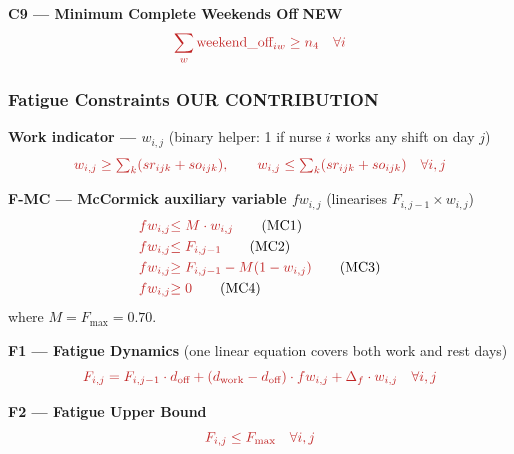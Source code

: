 \documentclass[12pt,a4paper]{article}
\newcommand{\newbadge}{\colorbox{accentgreen}{\tiny\color{white}\textbf{NEW}}\,}
\newcommand{\contribbadge}{\colorbox{accentred}{\tiny\color{white}\textbf{OUR CONTRIBUTION}}\,}
\begin{document}
\vspace{6pt}
\begin{eqbox}
\textbf{C9 — Minimum Complete Weekends Off} \newbadge
\begin{equation}
  \textcolor{accentred}{\sum_w \text{weekend\_off}_{iw} \geq n_4 \quad \forall i}
\end{equation}
\end{eqbox}

\subsubsection{Fatigue Constraints \contribbadge}

\begin{eqbox}
\textbf{Work indicator — $w_{i,j}$} (binary helper: 1 if nurse $i$ works any shift on day $j$)
\begin{equation}
  \textcolor{accentred}{
    w_{i,j} \geq \textstyle\sum_k(sr_{ijk}+so_{ijk}), \qquad
    w_{i,j} \leq \textstyle\sum_k(sr_{ijk}+so_{ijk}) \quad \forall i,j
  }
\end{equation}

\textbf{F-MC — McCormick auxiliary variable $fw_{i,j}$} (linearises $F_{i,j-1}\times w_{i,j}$)
\begin{align}
  \textcolor{accentred}{fw_{i,j}} &\textcolor{accentred}{\leq M \cdot w_{i,j}} \tag{MC1}\\
  \textcolor{accentred}{fw_{i,j}} &\textcolor{accentred}{\leq F_{i,j-1}} \tag{MC2}\\
  \textcolor{accentred}{fw_{i,j}} &\textcolor{accentred}{\geq F_{i,j-1} - M(1-w_{i,j})} \tag{MC3}\\
  \textcolor{accentred}{fw_{i,j}} &\textcolor{accentred}{\geq 0} \tag{MC4}
\end{align}
where $M = F_{\max} = 0.70$.

\textbf{F1 — Fatigue Dynamics} (one linear equation covers both work and rest days)
\begin{equation}
  \textcolor{accentred}{
    F_{i,j} = F_{i,j-1}\cdot d_{\text{off}}
    + (d_{\text{work}}-d_{\text{off}})\cdot fw_{i,j}
    + \Delta_f \cdot w_{i,j}
    \quad\forall i,j
  }
\end{equation}

\textbf{F2 — Fatigue Upper Bound}
\begin{equation}
  \textcolor{accentred}{F_{i,j} \leq F_{\max} \quad \forall i,j}
\end{equation}
\end{eqbox}
\end{document}
